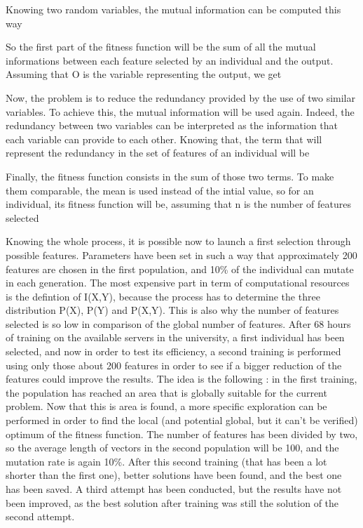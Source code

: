\documentclass{report}
\begin{document}
			Knowing two random variables, the mutual information can be computed this way
			
			
			So the first part of the fitness function will be the sum of all the mutual informations between each feature selected by an individual and the output. Assuming that O is the variable representing the output, we get 
			
			
			Now, the problem is to reduce the redundancy provided by the use of two similar variables. To achieve this, the mutual information will be used again. Indeed, the redundancy between two variables can be interpreted as the information that each variable can provide to each other. Knowing that, the term that will represent the redundancy in the set of features of an individual will be
			
			
			Finally, the fitness function consists in the sum of those two terms. To make them comparable, the mean is used instead of the intial value, so for an individual, its fitness function will be, assuming that n is the number of features selected
			
			
			Knowing the whole process, it is possible now to launch a first selection through possible features. Parameters have been set in such a way that approximately 200 features are chosen in the first population, and 10\% of the individual can mutate in each generation. The most expensive part in term of computational resources is the defintion of I(X,Y), because the process has to determine the three distribution P(X), P(Y) and P(X,Y). This is also why the number of features selected is so low in comparison of the global number of features. After 68 hours of training on the available servers in the university, a first individual has been selected, and now in order to test its efficiency, a second training is performed using only those about 200 features in order to see if a bigger reduction of the features could improve the results. The idea is the following : in the first training, the population has reached an area that is globally suitable for the current problem. Now that this is area is found, a more specific exploration can be performed in order to find the local (and potential global, but it can't be verified) optimum of the fitness function. The number of features has been divided by two, so the average length of vectors in the second population will be 100, and the mutation rate is again 10\%. After this second training (that has been a lot shorter than the first one), better solutions have been found, and the best one has been saved. A third attempt has been conducted, but the results have not been improved, as the best solution after training was still the solution of the second attempt.\\
			
\end{document}
